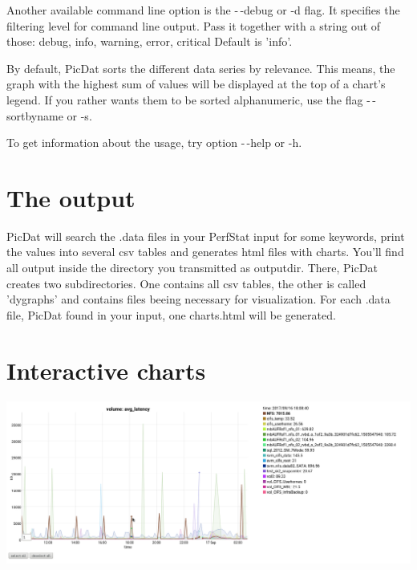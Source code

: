 \documentclass[8pt]{extarticle}
\begin{document}
Another available command line option is the -\,-debug or -d flag. It specifies the filtering level for command line output. Pass it together with a string out of those: debug, info, warning, error, critical
Default is 'info'.

By default, PicDat sorts the different data series by relevance. This means, the graph with the highest sum of values will be displayed at the top of a chart's legend. If you rather wants them to be sorted alphanumeric, use the flag -\,-sortbyname or -s.

To get information about the usage, try option -\,-help or -h.
\bigskip

\section*{The output}
PicDat will search the .data files in your PerfStat input for some keywords, print the values into several csv tables and generates html files with charts. You'll find all output inside the directory you transmitted as outputdir. There, PicDat creates two subdirectories. One contains all csv tables, the other is called 'dygraphs' and contains files beeing necessary for visualization. For each .data file, PicDat found in your input, one charts.html will be generated.

\section*{Interactive charts}
\includegraphics[scale=0.3]{PicDat_hightlight2}
\end{document}
